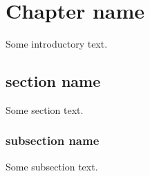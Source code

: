 \chapter{Chapter name}
\label{s:1}
Some introductory text.

\section{section name}
\label{s:2}
Some section text.

\subsection{subsection name}
\label{s:3}
Some subsection text.

\setcounter{tocdepth}{3}
\tableofcontents
